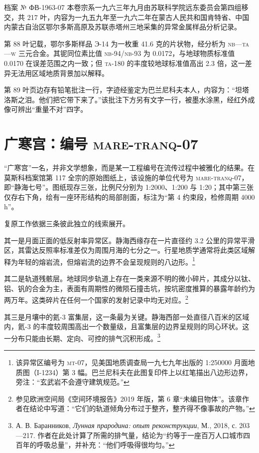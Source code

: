 \begin{archive}{档案 № ФВ-1963-07}
本卷宗系一九六三年九月由苏联科学院远东委员会第四组移交，共 217 叶，内容为一九五九年至一九六二年在蒙古人民共和国肯特省、中国内蒙古自治区鄂尔多斯高原及苏联赤塔州三地采集的异常金属样品分析记录。

第 88 叶记载，鄂尔多斯样品 Э-14 为一枚重 41.6 克的片状物，经分析为 \textsc{nb}—\textsc{ta}—\textsc{w} 三元合金。其铌同位素比值 \textsc{nb}-94/\textsc{nb}-93 为 0.0172，与地球物质标准值 0.0170 在误差范围之内一致；但 \textsc{ta}-180 的丰度较地球标准值高出 2.3 倍，这一差异无法用区域地质背景加以解释。

第 89 叶页边存有铅笔批注一行，字迹经鉴定为巴兰尼科夫本人，内容为：“坦塔洛斯之泪。他们把它带下来了。”该批注下方另有文字一行，被墨水涂黑，经红外成像可辨出“重量不对”四字。
\end{archive}

\section{广寒宫：编号 \textsc{mare-tranq-07}}

“广寒宫”一名，并非文学想象，而是某一工程编号在流传过程中被雅化的结果。在莫斯科档案馆第 117 全宗的原始图纸上，该设施的单位代号为 \textsc{mare-tranq-07}，即“静海七号”。图纸现存三张，比例尺分别为 1:2000、1:200 与 1:20；其中第三张仅存右下角，绘有一座环形结构的局部剖面，标注为“第 4 约束段，检修周期 4000 h”。

复原工作依据三条彼此独立的线索展开。

其一是月面正面的低反射率异常区。静海西缘存在一片直径约 3.2 公里的异常平滑区，其雷达反照率标准差仅为周围月海的七分之一。行星地质学通常将此类区域解释为年轻的熔岩流，但熔岩流的边界不会呈现规则的八边形。\footnote{该异常区编号为 \textsc{mt}-07，见美国地质调查局一九七九年出版的 1:250000 月面地质图（I-1234）第 3 幅。巴兰尼科夫在此图复印件上以红笔描出八边形边界，旁注：“玄武岩不会遵守建筑规范。”}

其二是轨道残骸层。地球同步轨道上存在一类来源不明的微小碎片，其成分以钛、铝、钒的合金为主，表面有周期性的微陨石撞击坑，按坑密度推算的暴露年龄约为两万年。这类碎片在任何一个国家的发射记录中均无对应。\footnote{参见欧洲空间局《空间环境报告》2019 年版，第 6 章“未编目物体”。该章作者在结论中写道：“它们的轨道倾角分布过于整齐，整齐得不像事故的产物。”}

其三是月壤中的氦-3 富集层，这一条最为关键。静海西部一处直径八百米的区域内，氦-3 的丰度较周围高出一个数量级，且富集层的边界呈规则的同心环状。这一分布只能由长期、定向、可控的排气沉积形成。\footnote{А. В. Баранников, \textit{Лунная прародина: опыт реконструкции}, М., 2018, с. 203—217. 作者在此处计算了所需的排气量，结论为“约等于一座百万人口城市四百年的呼吸总量”，并补充：“他们呼吸得很均匀。”}

